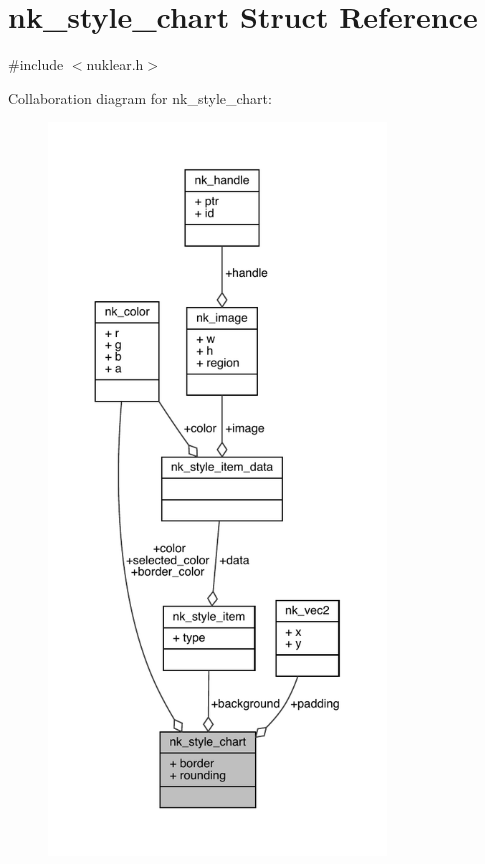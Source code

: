 \hypertarget{structnk__style__chart}{}\section{nk\+\_\+style\+\_\+chart Struct Reference}
\label{structnk__style__chart}


{\ttfamily \#include $<$nuklear.\+h$>$}



Collaboration diagram for nk\+\_\+style\+\_\+chart\+:
\nopagebreak
\begin{figure}[H]
\begin{center}
\leavevmode
\includegraphics[height=550pt]{structnk__style__chart__coll__graph}
\end{center}
\end{figure}
